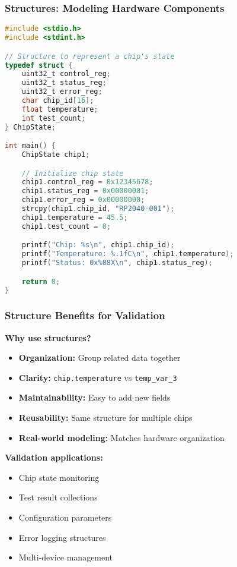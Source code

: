 \documentclass{beamer}
\begin{document}
\begin{frame}[fragile]
\frametitle{Structures: Modeling Hardware Components}
\begin{lstlisting}[language=C]
#include <stdio.h>
#include <stdint.h>

// Structure to represent a chip's state
typedef struct {
    uint32_t control_reg;
    uint32_t status_reg;
    uint32_t error_reg;
    char chip_id[16];
    float temperature;
    int test_count;
} ChipState;

int main() {
    ChipState chip1;

    // Initialize chip state
    chip1.control_reg = 0x12345678;
    chip1.status_reg = 0x00000001;
    chip1.error_reg = 0x00000000;
    strcpy(chip1.chip_id, "RP2040-001");
    chip1.temperature = 45.5;
    chip1.test_count = 0;

    printf("Chip: %s\n", chip1.chip_id);
    printf("Temperature: %.1fC\n", chip1.temperature);
    printf("Status: 0x%08X\n", chip1.status_reg);

    return 0;
}
\end{lstlisting}
\end{frame}

\begin{frame}
\frametitle{Structure Benefits for Validation}
\textbf{Why use structures?}
\begin{itemize}
    \item \textbf{Organization:} Group related data together
    \item \textbf{Clarity:} \texttt{chip.temperature} vs \texttt{temp\_var\_3}
    \item \textbf{Maintainability:} Easy to add new fields
    \item \textbf{Reusability:} Same structure for multiple chips
    \item \textbf{Real-world modeling:} Matches hardware organization
\end{itemize}

\vspace{0.5cm}
\textbf{Validation applications:}
\begin{itemize}
    \item Chip state monitoring
    \item Test result collections
    \item Configuration parameters
    \item Error logging structures
    \item Multi-device management
\end{itemize}
\end{frame}
\end{document}
